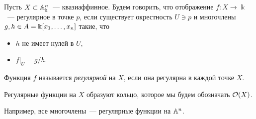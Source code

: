 	\begin{definition} 
		Пусть $X \subset \AA^{n}_{\bk}$~--- квазиаффинное. Будем говорить, что отображение $f\colon X \to \Bbbk$~--- регулярное в точке $p$, если существует окрестность $U \ni p$ и многочлены $g, h \in A = \bk[x_1, \ldots, x_n]$ такие, что 

		\begin{itemize}
			\item $h$ не имеет нулей в $U$,
			\item $f\vert_{U} = g/h$.
		\end{itemize}
		
		Функция $f$ называется \emph{регулярной} на $X$, если она регулярна в каждой точке $X$. 
	\end{definition}


	Регулярные функции на $X$ образуют кольцо, которое мы будем обозначать $\cO(X)$. 

	\begin{remark}
		Например, все многочлены~--- регулярные функции на $\AA^n$. 
	\end{remark}

